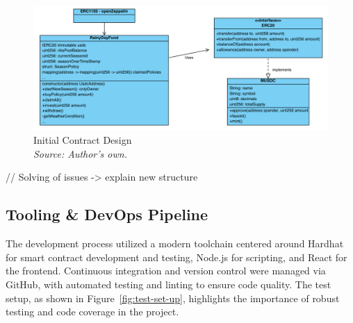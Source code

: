 \documentclass[11pt,a4paper]{article}
\begin{document}
    \begin{figure}[H]
        \centering
        \includegraphics[scale=0.5]{graphics/ClassDiagram_Old}
        \caption{Initial Contract Design \\ \textit{Source: Author's own.}}
        \label{fig:initial-contract-design}
    \end{figure}

    // Solving of issues -> explain new structure

    \subsection{Tooling \& DevOps Pipeline}\label{subsec:tooling-devops}
    The development process utilized a modern toolchain centered around Hardhat for smart contract development and testing, Node.js for scripting, and React for the frontend.
    Continuous integration and version control were managed via GitHub, with automated testing and linting to ensure code quality.
    The test setup, as shown in Figure~\ref{fig:test-set-up}, highlights the importance of robust testing and code coverage in the project.
\end{document}
